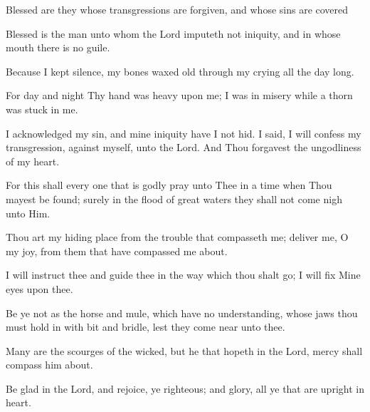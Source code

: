 Blessed are they whose transgressions are forgiven, and whose sins are covered

Blessed is the man unto whom the Lord imputeth not iniquity, and in whose mouth there is no guile.

Because I kept silence, my bones waxed old through my crying all the day long.

For day and night Thy hand was heavy upon me; I was in misery while a thorn was stuck in me.

I acknowledged my sin, and mine iniquity have I not hid. I said, I will confess my transgression, against myself, unto the Lord.
And Thou forgavest the ungodliness of my heart.

For this shall every one that is godly pray unto Thee in a time when Thou mayest be found; surely in the flood of great waters they shall not come nigh unto Him.

Thou art my hiding place from the trouble that compasseth me; deliver me, O my joy, from them that have compassed me about.

I will instruct thee and guide thee in the way which thou shalt go; I will fix Mine eyes upon thee.

Be ye not as the horse and mule, which have no understanding, whose jaws thou must hold in with bit and bridle, lest they come near unto thee.

Many are the scourges of the wicked, but he that hopeth in the Lord, mercy shall compass him about.

Be glad in the Lord, and rejoice, ye righteous; and glory, all ye that are upright in heart.
